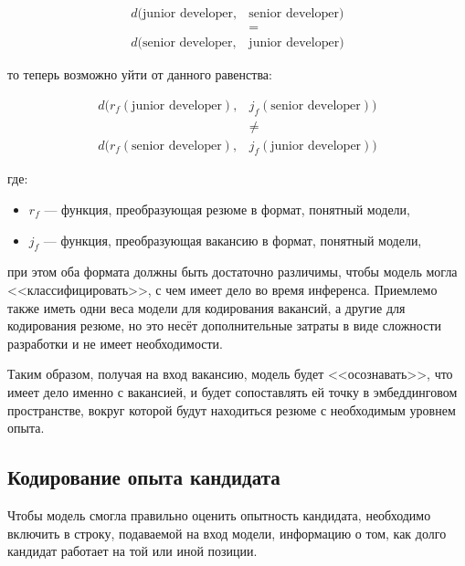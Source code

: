\documentclass[14pt]{mmcs_article}
\begin{document}
\begin{equation}
  \label{eq:assymetric_search_problem}
  \begin{aligned}
    d(\text{junior developer}, & \text{senior developer}) \\
                               & =                        \\
    d(\text{senior developer}, & \text{junior developer})
  \end{aligned}
\end{equation}

то теперь возможно уйти от данного равенства:

\begin{equation}
  \label{eq:solved_assymetric_search_problem}
  \begin{aligned}
    d(r_{f}(\text{junior developer}), & j_{f}(\text{senior developer})) \\
                                      & \neq                            \\
    d(r_{f}(\text{senior developer}), & j_{f}(\text{junior developer}))
  \end{aligned}
\end{equation}

где:
\begin{itemize}
  \item $r_{f}$ --- функция, преобразующая резюме в формат, понятный модели,
  \item $j_{f}$ --- функция, преобразующая вакансию в формат, понятный модели,
\end{itemize}

при этом оба формата должны быть достаточно различимы, чтобы модель могла <<классифицировать>>,  с чем имеет дело во время инференса. Приемлемо также иметь одни веса модели для кодирования вакансий, а другие для кодирования резюме, но это несёт дополнительные затраты в виде сложности разработки и не имеет необходимости.

Таким образом, получая на вход вакансию, модель будет <<осознавать>>, что имеет дело именно с вакансией, и будет сопоставлять ей точку в эмбеддинговом пространстве, вокруг которой будут находиться резюме с необходимым уровнем опыта.

\subsection*{Кодирование опыта кандидата}

Чтобы модель смогла правильно оценить опытность кандидата, необходимо включить в строку, подаваемой на вход модели, информацию о том, как долго кандидат работает на той или иной позиции.
\end{document}
